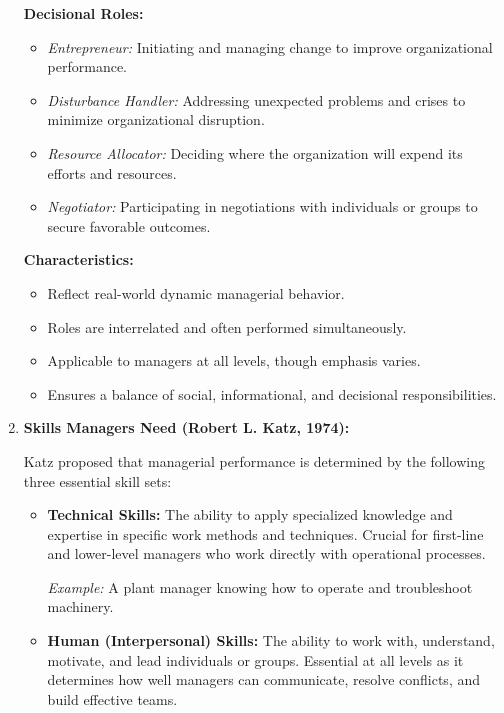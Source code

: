 \documentclass[12pt,a4paper]{book}
\begin{document}
\begin{enumerate}
    \textbf{Decisional Roles:}
    \begin{itemize}
        \item \textit{Entrepreneur:} Initiating and managing change to improve organizational performance.
        \item \textit{Disturbance Handler:} Addressing unexpected problems and crises to minimize organizational disruption.
        \item \textit{Resource Allocator:} Deciding where the organization will expend its efforts and resources.
        \item \textit{Negotiator:} Participating in negotiations with individuals or groups to secure favorable outcomes.
    \end{itemize}

    \textbf{Characteristics:}
    \begin{itemize}
        \item Reflect real-world dynamic managerial behavior.
        \item Roles are interrelated and often performed simultaneously.
        \item Applicable to managers at all levels, though emphasis varies.
        \item Ensures a balance of social, informational, and decisional responsibilities.
    \end{itemize}

    \item \textbf{Skills Managers Need (Robert L. Katz, 1974):}

    Katz proposed that managerial performance is determined by the following three essential skill sets:

    \begin{itemize}
        \item \textbf{Technical Skills:} 
        The ability to apply specialized knowledge and expertise in specific work methods and techniques. Crucial for first-line and lower-level managers who work directly with operational processes.

        \textit{Example:} A plant manager knowing how to operate and troubleshoot machinery.

        \item \textbf{Human (Interpersonal) Skills:}
        The ability to work with, understand, motivate, and lead individuals or groups. Essential at all levels as it determines how well managers can communicate, resolve conflicts, and build effective teams.


\end{itemize}
\end{enumerate}
\end{document}
